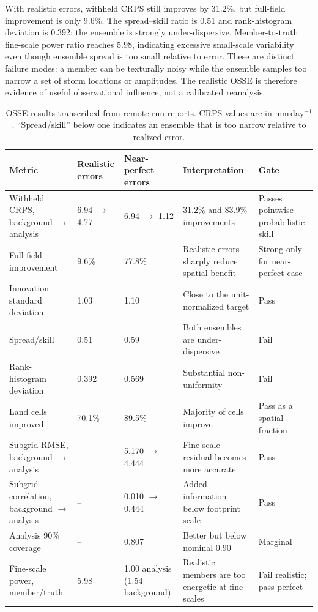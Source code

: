 \documentclass[10pt,twocolumn]{article}
\newcommand{\mmday}{\mathrm{mm\,day^{-1}}}
\begin{document}
With realistic errors, withheld CRPS still improves by 31.2\%, but full-field improvement is only 9.6\%. The spread--skill ratio is 0.51 and rank-histogram deviation is 0.392; the ensemble is strongly under-dispersive. Member-to-truth fine-scale power ratio reaches 5.98, indicating excessive small-scale variability even though ensemble spread is too small relative to error. These are distinct failure modes: a member can be texturally noisy while the ensemble samples too narrow a set of storm locations or amplitudes. The realistic OSSE is therefore evidence of useful observational influence, not a calibrated reanalysis.

\begin{table}[t]
\centering
\caption{OSSE results transcribed from remote run reports. CRPS values are in $\mmday$. ``Spread/skill'' below one indicates an ensemble that is too narrow relative to realized error.}
\label{tab:osse}
\small
\begin{tabular}{L{0.21\textwidth}L{0.11\textwidth}L{0.11\textwidth}L{0.23\textwidth}L{0.18\textwidth}}
\toprule
Metric & Realistic errors & Near-perfect errors & Interpretation & Gate \\
\midrule
Withheld CRPS, background $\rightarrow$ analysis & 6.94 $\rightarrow$ 4.77 & 6.94 $\rightarrow$ 1.12 & 31.2\% and 83.9\% improvements & Passes pointwise probabilistic skill \\
Full-field improvement & 9.6\% & 77.8\% & Realistic errors sharply reduce spatial benefit & Strong only for near-perfect case \\
Innovation standard deviation & 1.03 & 1.10 & Close to the unit-normalized target & Pass \\
Spread/skill & 0.51 & 0.59 & Both ensembles are under-dispersive & Fail \\
Rank-histogram deviation & 0.392 & 0.569 & Substantial non-uniformity & Fail \\
Land cells improved & 70.1\% & 89.5\% & Majority of cells improve & Pass as a spatial fraction \\
Subgrid RMSE, background $\rightarrow$ analysis & -- & 5.170 $\rightarrow$ 4.444 & Fine-scale residual becomes more accurate & Pass \\
Subgrid correlation, background $\rightarrow$ analysis & -- & 0.010 $\rightarrow$ 0.444 & Added information below footprint scale & Pass \\
Analysis 90\% coverage & -- & 0.807 & Better but below nominal 0.90 & Marginal \\
Fine-scale power, member/truth & 5.98 & 1.00 analysis (1.54 background) & Realistic members are too energetic at fine scales & Fail realistic; pass perfect \\
\bottomrule
\end{tabular}
\end{table}
\end{document}
